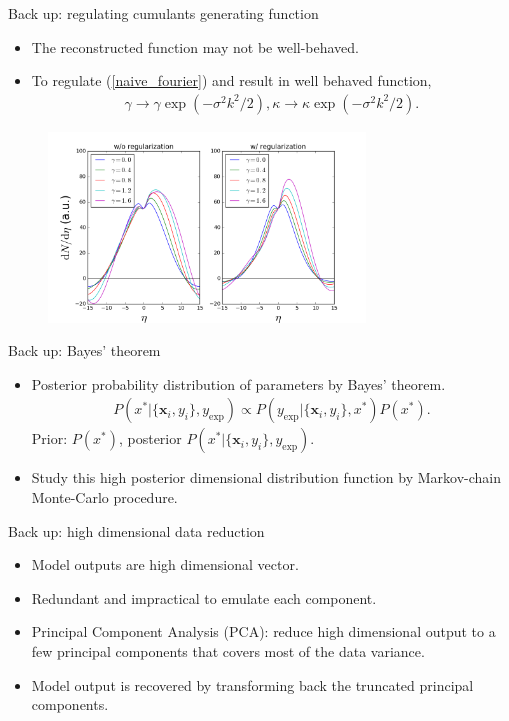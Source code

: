\documentclass[11pt]{beamer}
\begin{document}
\begin{frame}[noframenumbering]{Back up: regulating cumulants generating function}
\begin{itemize}
\item The reconstructed function may not be well-behaved.
\item To regulate (\ref{naive_fourier}) and result in well behaved function,
\begin{eqnarray}
\nonumber
 \gamma \rightarrow \gamma\exp\left(-\sigma^2k^2/2\right), \kappa \rightarrow \kappa\exp\left(-\sigma^2k^2/2\right). 
\end{eqnarray}
\end{itemize}
\begin{center}
\begin{figure}
\includegraphics[width=0.75\textwidth]{pics/regulate.png}
\end{figure}
\end{center}
\end{frame}

\begin{frame}[noframenumbering]{Back up: Bayes' theorem}
\begin{itemize}
\item Posterior probability distribution of parameters by Bayes' theorem.
\begin{eqnarray}
\nonumber
P(x^* | \{\mathbf{x}_i, y_i\}, y_{\textrm{exp}} )
 \propto P(y_{\textrm{exp}}|\{\mathbf{x}_i, y_i\}, x^*) P(x^*).
\end{eqnarray}
Prior: $P(x^*)$, posterior $P(x^* | \{\mathbf{x}_i, y_i\}, y_{\textrm{exp}} )$.
\item Study this high posterior dimensional distribution function by Markov-chain Monte-Carlo procedure.
\end{itemize}
\end{frame}

\begin{frame}[noframenumbering]{Back up: high dimensional data reduction}
\begin{itemize}
\item Model outputs are high dimensional vector.
\item Redundant and impractical to emulate each component.
\item Principal Component Analysis (PCA): reduce high dimensional output to a few principal components that covers most of the data variance.
\item Model output is recovered by transforming back the truncated principal components.
\end{itemize}
\end{frame}
\end{document}
